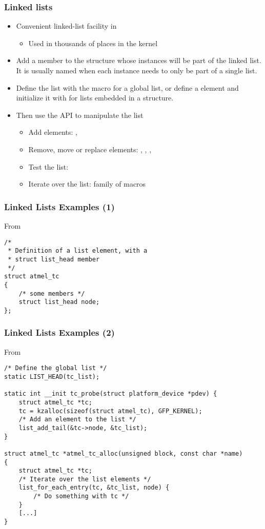 \begin{frame}
  \frametitle{Linked lists}
  \begin{itemize}
  \item Convenient linked-list facility in 
    \begin{itemize}
    \item Used in thousands of places in the kernel
    \end{itemize}
  \item Add a  member to the structure whose
    instances will be part of the linked list. It is usually named
     when each instance needs to only be part of a single
    list.
  \item Define the list with the  macro for a global
    list, or define a  element and initialize
    it with  for lists embedded in a structure.
  \item Then use the  API to manipulate the list
    \begin{itemize}
    \item Add elements: , 
    \item Remove, move or replace elements: ,
      , ,
    \item Test the list: 
    \item Iterate over the list:  family of macros
    \end{itemize}
  \end{itemize}
\end{frame}

\begin{frame}[fragile]
  \frametitle{Linked Lists Examples (1)}
  From 
\begin{verbatim}
/*
 * Definition of a list element, with a
 * struct list_head member
 */
struct atmel_tc
{
    /* some members */
    struct list_head node;
};
\end{verbatim}
\end{frame}

\begin{frame}[fragile]
  \frametitle{Linked Lists Examples (2)}
  From 
\begin{verbatim}
/* Define the global list */
static LIST_HEAD(tc_list);

static int __init tc_probe(struct platform_device *pdev) {
    struct atmel_tc *tc;
    tc = kzalloc(sizeof(struct atmel_tc), GFP_KERNEL);
    /* Add an element to the list */
    list_add_tail(&tc->node, &tc_list);
}

struct atmel_tc *atmel_tc_alloc(unsigned block, const char *name)
{
    struct atmel_tc *tc;
    /* Iterate over the list elements */
    list_for_each_entry(tc, &tc_list, node) {
        /* Do something with tc */
    }
    [...]
}
\end{verbatim}
\end{frame}
